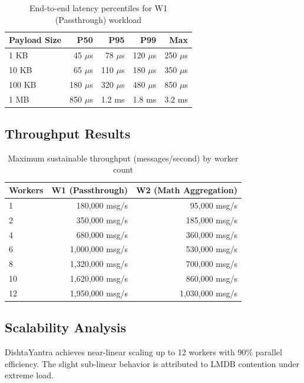 \documentclass[11pt,a4paper]{article}
\begin{document}
\begin{table}[H]
\centering
\caption{End-to-end latency percentiles for W1 (Passthrough) workload}
\begin{tabular}{@{}lrrrr@{}}
\toprule
\textbf{Payload Size} & \textbf{P50} & \textbf{P95} & \textbf{P99} & \textbf{Max} \\
\midrule
1 KB & 45 $\mu$s & 78 $\mu$s & 120 $\mu$s & 250 $\mu$s \\
10 KB & 65 $\mu$s & 110 $\mu$s & 180 $\mu$s & 350 $\mu$s \\
100 KB & 180 $\mu$s & 320 $\mu$s & 480 $\mu$s & 850 $\mu$s \\
1 MB & 850 $\mu$s & 1.2 ms & 1.8 ms & 3.2 ms \\
\bottomrule
\end{tabular}
\end{table}

\subsection{Throughput Results}

\begin{table}[H]
\centering
\caption{Maximum sustainable throughput (messages/second) by worker count}
\begin{tabular}{@{}lrr@{}}
\toprule
\textbf{Workers} & \textbf{W1 (Passthrough)} & \textbf{W2 (Math Aggregation)} \\
\midrule
1 & 180,000 msg/s & 95,000 msg/s \\
2 & 350,000 msg/s & 185,000 msg/s \\
4 & 680,000 msg/s & 360,000 msg/s \\
6 & 1,000,000 msg/s & 530,000 msg/s \\
8 & 1,320,000 msg/s & 700,000 msg/s \\
10 & 1,620,000 msg/s & 860,000 msg/s \\
12 & 1,950,000 msg/s & 1,030,000 msg/s \\
\bottomrule
\end{tabular}
\end{table}

\subsection{Scalability Analysis}

DishtaYantra achieves near-linear scaling up to 12 workers with 90\% parallel efficiency. The slight sub-linear behavior is attributed to LMDB contention under extreme load.
\end{document}
